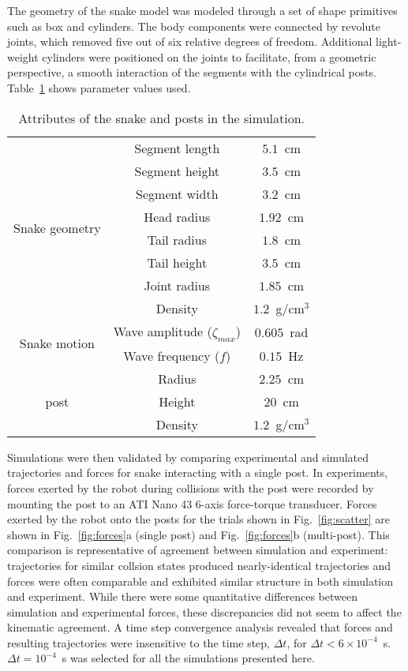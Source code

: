 \documentclass[aps,pre,twocolumn,superscriptaddress]{revtex4-1}
\begin{document}
The geometry of the snake model was modeled through a set of shape primitives such as box and cylinders. The body components were connected by revolute joints, which removed five out of six relative degrees of freedom. Additional light-weight cylinders were positioned on the joints to facilitate, from a geometric perspective, a smooth interaction of the segments with the cylindrical posts. Table~\ref{tab:simDetails} shows parameter values used.

\begin{center}
	\begin{table}
		\centering
		\begin{tabular}{ | c | c | c | }
			\hline
			\multirow{8}{*}{Snake geometry} 
			& Segment length & $5.1$~cm \\
			& Segment height & $3.5$~cm \\
			& Segment width & $3.2$~cm \\
			& Head radius & $1.92$~cm \\ 
			& Tail radius & $1.8$~cm \\ 
			& Tail height & $3.5$~cm \\ 
			& Joint radius & $1.85$~cm \\ 
			& Density & $1.2$~g/cm$^3$ \\ \hline
			\multirow{2}{*}{Snake motion} 
			& Wave amplitude ($\zeta_{max}$) & $0.605$~rad \\
			& Wave frequency ($f$) & $0.15$~Hz \\ \hline
			\multirow{3}{*}{post} 
			& Radius & $2.25$~cm\\
			& Height & $20$~cm\\
			& Density & $1.2$~g/cm$^3$\\ 
			\hline
		\end{tabular}
		\caption{Attributes of the snake and posts in the simulation.}
		\label{tab:simDetails}
	\end{table}
\end{center}


Simulations were then validated by comparing experimental and simulated trajectories and forces for snake interacting with a single post. In experiments, forces exerted by the robot during collisions with the post were recorded by mounting the post to an ATI Nano 43 6-axis force-torque transducer. Forces exerted by the robot onto the posts for the trials shown in Fig.~\ref{fig:scatter} are shown in Fig.~\ref{fig:forces}a (single post) and Fig.~\ref{fig:forces}b (multi-post). This comparison is representative of agreement between simulation and experiment: trajectories for similar collsion states produced nearly-identical trajectories and forces were often comparable and exhibited similar structure in both simulation and experiment. While there were some quantitative differences between simulation and experimental forces, these discrepancies did not seem to affect the kinematic agreement. A time step convergence analysis revealed that forces and resulting trajectories were insensitive to the time step, $\Delta t$, for $\Delta t<6\times10^{-4}$~s. $\Delta t = 10^{-4}$~s was selected for all the simulations presented here.
\end{document}

